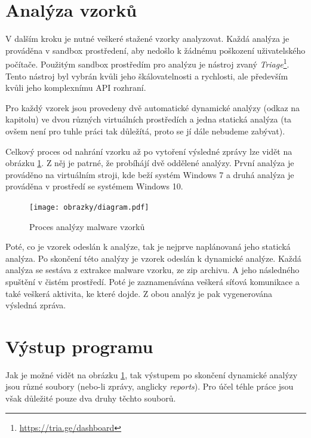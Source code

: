 \section{Analýza vzorků}
V dalším kroku je nutné veškeré stažené vzorky analyzovat. Každá analýza je prováděna v sandbox prostředení, aby nedošlo k žádnému poškození uživatelského počítače.
Použitým sandbox prostředím pro analýzu je nástroj zvaný \textit{Triage}\footnote{\href{https://tria.ge/dashboard}{https://tria.ge/dashboard}}. Tento nástroj byl vybrán kvůli jeho škálovatelnosti a rychlosti, 
ale především kvůli jeho komplexnímu API rozhraní.

Pro každý vzorek jsou provedeny dvě automatické dynamické analýzy (odkaz na kapitolu) ve dvou různých virtuálních prostředích a jedna statická analýza (ta ovšem není pro tuhle práci tak důležítá, proto se jí dále nebudeme zabývat). 

Celkový proces od nahrání vzorku až po vytoření výsledné zprávy lze vidět na obrázku \ref{Analysis_diagram}. Z něj je patrné, že probíhájí dvě oddělené analýzy. První analýza je prováděno na virtuálním stroji, kde beží 
systém Windows 7 a druhá analýza je prováděna v prostředí se systémem Windows 10.

\begin{figure}[h]
	\centering
        \texttt{[image: obrazky/diagram.pdf]}
	\caption{Proces analýzy malware vzorků}
    \label{Analysis_diagram}
\end{figure}

Poté, co je vzorek odeslán k analýze, tak je nejprve naplánovaná jeho statická analýza. Po skončení této analýzy je vzorek odeslán k dynamické analýze. Každá analýza se sestáva z extrakce malware vzorku, ze zip archivu. A jeho následného spuštění v čistém prostředí. Poté je zaznamenávána veškerá síťová komunikace a také veškerá aktivita, ke které dojde.
Z obou analýz je pak vygenerována výsledná zpráva.
\section{Výstup programu}
Jak je možné vidět na obrázku \ref{Analysis_diagram}, tak výstupem po skončení dynamické analýzy jsou různé soubory (nebo-li zprávy, anglicky \textit{reports}). Pro účel téhle práce jsou však důležité pouze dva druhy těchto souborů.

